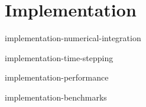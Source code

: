 \chapter{Implementation}
 {implementation-numerical-integration}

 {implementation-time-stepping}

 {implementation-performance}

 {implementation-benchmarks}